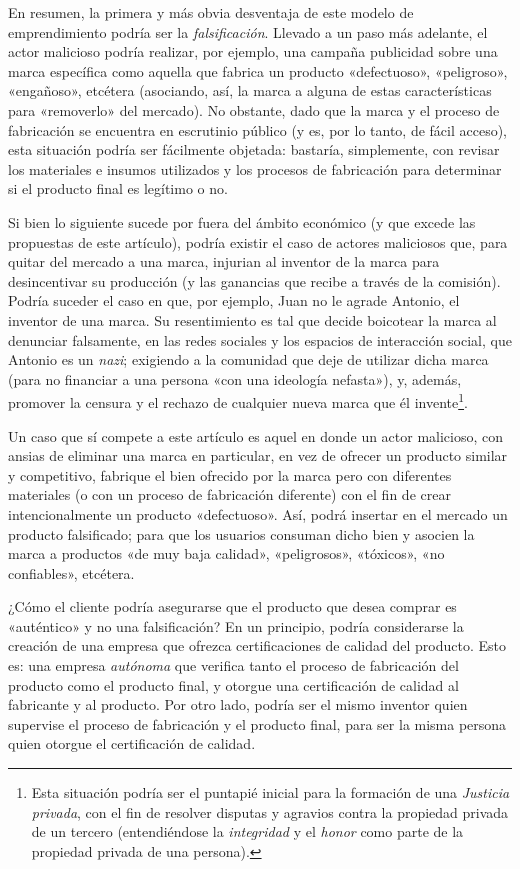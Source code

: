 \documentclass[12pt,a4paper]{article}
\begin{document}
En resumen, la primera y más obvia desventaja de este modelo de emprendimiento podría ser la \textit{falsificación}. Llevado a un paso más adelante, el actor malicioso podría realizar, por ejemplo, una campaña publicidad sobre una marca específica como aquella que fabrica un producto «defectuoso», «peligroso», «engañoso», etcétera (asociando, así, la marca a alguna de estas características para «removerlo» del mercado). No obstante, dado que la marca y el proceso de fabricación se encuentra en escrutinio público (y es, por lo tanto, de fácil acceso), esta situación podría ser fácilmente objetada: bastaría, simplemente, con revisar los materiales e insumos utilizados y los procesos de fabricación para determinar si el producto final es legítimo o no.

Si bien lo siguiente sucede por fuera del ámbito económico (y que excede las propuestas de este artículo), podría existir el caso de actores maliciosos que, para quitar del mercado a una marca, injurian al inventor de la marca para desincentivar su producción (y las ganancias que recibe a través de la comisión). Podría suceder el caso en que, por ejemplo, Juan no le agrade Antonio, el inventor de una marca. Su resentimiento es tal que decide boicotear la marca al denunciar falsamente, en las redes sociales y los espacios de interacción social, que Antonio es un \textit{nazi}; exigiendo a la comunidad que deje de utilizar dicha marca (para no financiar a una persona «con una ideología nefasta»), y, además, promover la censura y el rechazo de cualquier nueva marca que él invente\footnote{Esta situación podría ser el puntapié inicial para la formación de una \textit{Justicia privada}, con el fin de resolver disputas y agravios contra la propiedad privada de un tercero (entendiéndose la \textit{integridad} y el \textit{honor} como parte de la propiedad privada de una persona).}.

Un caso que sí compete a este artículo es aquel en donde un actor malicioso, con ansias de eliminar una marca en particular, en vez de ofrecer un producto similar y competitivo, fabrique el bien ofrecido por la marca pero con diferentes materiales (o con un proceso de fabricación diferente) con el fin de crear intencionalmente un producto «defectuoso». Así, podrá insertar en el mercado un producto falsificado; para que los usuarios consuman dicho bien y asocien la marca a productos «de muy baja calidad», «peligrosos», «tóxicos», «no confiables», etcétera.

¿Cómo el cliente podría asegurarse que el producto que desea comprar es «auténtico» y no una falsificación? En un principio, podría considerarse la creación de una empresa que ofrezca certificaciones de calidad del producto. Esto es: una empresa \textit{autónoma} que verifica tanto el proceso de fabricación del producto como el producto final, y otorgue una certificación de calidad al fabricante y al producto. Por otro lado, podría ser el mismo inventor quien supervise el proceso de fabricación y el producto final, para ser la misma persona quien otorgue el certificación de calidad.
\end{document}

